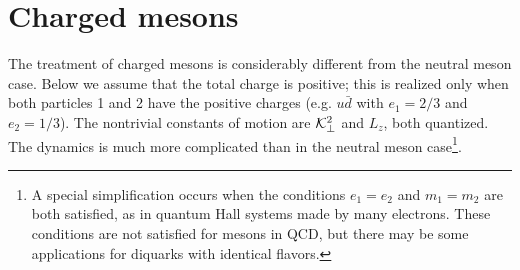 %

\section{Charged mesons}
\label{sec:charged}

The treatment of charged mesons is considerably different from the neutral meson case. Below we assume that the total charge is positive; this is realized only when both particles 1 and 2 have the positive charges (e.g. $u \bar{d}$ with $e_1=2/3$ and $e_2=1/3$). 
The nontrivial constants of motion are $\mathcal{K}_\perp^2$ and $L_z$, both quantized. The dynamics is much more complicated than in the neutral meson case\footnote{A special simplification occurs when the conditions $e_1=e_2$ and $m_1 = m_2$ are both satisfied, as in quantum Hall systems made by many electrons. These conditions are not satisfied for mesons in QCD, but there may be some applications for diquarks with identical flavors.}.

